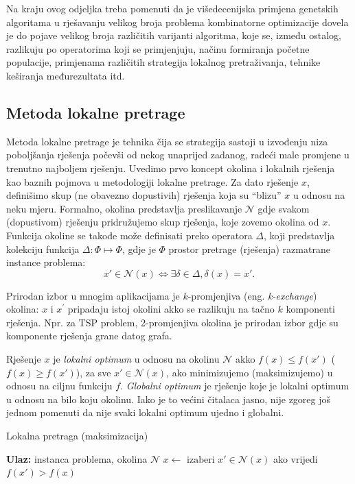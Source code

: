 \documentclass[a4paper, utf8, 11pt, colorlinks]{book}
\begin{document}
Na kraju ovog odjeljka treba pomenuti da je višedecenijska primjena genetskih algoritama u rješavanju velikog broja problema kombinatorne optimizacije dovela je do pojave velikog broja različitih varijanti algoritma, koje se, između ostalog, razlikuju po operatorima koji se primjenjuju, načinu formiranja početne populacije, primjenama različitih strategija lokalnog pretraživanja, tehnike keširanja međurezultata itd. 

 
\subsection{Metoda lokalne pretrage}\label{sec: local_search}

Metoda lokalne pretrage je tehnika čija se strategija sastoji u izvođenju niza poboljšanja  rješenja počevši od nekog unaprijed zadanog, radeći male promjene u trenutno najboljem rješenju. Uvedimo prvo koncept okolina i lokalnih rješenja kao baznih pojmova u metodologiji lokalne pretrage. Za dato rješenje $x$, definišimo skup (ne obavezno dopustivih) rješenja koja su ``blizu'' $x$ u odnosu na neku mjeru. Formalno, okolina predstavlja preslikavanje  $\mathcal{N}$ gdje svakom (dopustivom) rješenju pridružujemo skup rješenja, koje zovemo okolina od $x$.  Funkcija okoline se takođe može definisati preko operatora  $\Delta$, koji predstavlja kolekciju   funkcija $\Delta:\Phi \mapsto \Phi$,  gdje je $\Phi$ prostor pretrage (rješenja) razmatrane instance problema:
$$ x' \in \mathcal{N}(x) \Longleftrightarrow \exists \delta \in \Delta,\delta(x)=x'.$$
 
Prirodan izbor u mnogim aplikacijama je $k$-promjenjiva (eng. \emph{k-exchange}) okolina: $x$ i $x^{'}$ pripadaju istoj okolini akko se razlikuju na tačno $k$ komponenti rješenja. Npr. za TSP problem, 2-{promjenjiva} okolina je prirodan izbor gdje su komponente rješenja grane datog grafa.  

  
Rješenje $x$ je \emph{lokalni optimum} u odnosu na okolinu $\mathcal{N}$ akko
$f(x) \leq f(x')$ ($f(x) \geq f(x')$), za sve $x' \in \mathcal{N}(x)$, ako minimizujemo (maksimizujemo) u odnosu na ciljnu funkciju $f$.  \emph{Globalni optimum} je rješenje koje je lokalni optimum u odnosu na bilo koju okolinu.  Iako je to većini čitalaca jasno, nije zgoreg  još jednom pomenuti da nije svaki lokalni optimum ujedno i globalni. 

\begin{algorithm}[!t] 
	\caption{Lokalna pretraga (maksimizacija)}\label{alg:ls}
	\begin{algorithmic}[1]
		\STATE \textbf{Ulaz:} instanca problema, okolina $\mathcal{N}$
		\STATE $ x \gets  \text{ izaberi } x' \in \mathcal{N}(x) $ ako vrijedi  $f(x') > f(x)$ 
		\ENDWHILE
	\end{algorithmic}
\end{algorithm}
\end{document}
